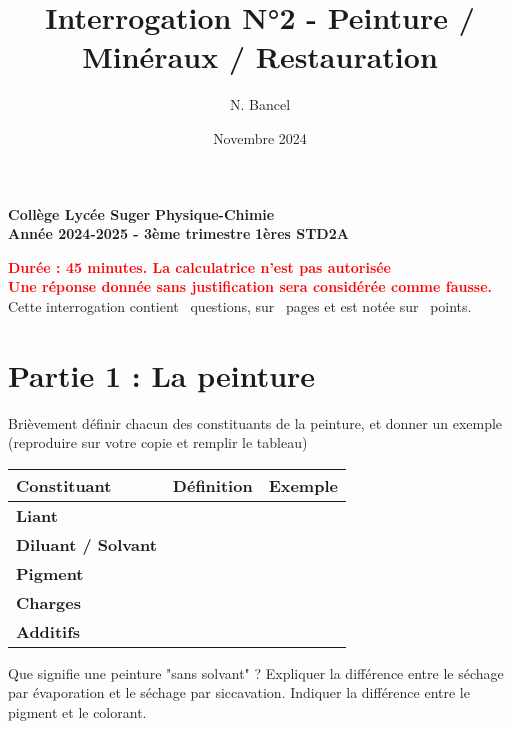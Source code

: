 \documentclass[addpoints]{exam}
\title{Interrogation N°2 - Peinture / Minéraux / Restauration}
\author{N. Bancel}
\date{Novembre 2024}
\begin{document}
\textbf{Collège Lycée Suger}
\hfill
\textbf{Physique-Chimie} \\

\textbf{Année 2024-2025 - 3ème trimestre}
\hfill
\textbf{1ères STD2A} \par

{\let\newpage\relax\maketitle}

\begin{center}
\textbf{\textcolor{red}{Durée : 45 minutes. La calculatrice n'est pas autorisée}} \\
\textbf{\textcolor{red}{Une réponse donnée sans justification sera considérée comme fausse.}} \\
Cette interrogation contient \numquestions\ questions, sur \numpages\ pages et est notée sur \numpoints\ points. 
\end{center}

\section{Partie 1 : La peinture}

\begin{questions}

  \question[4] Brièvement définir chacun des constituants de la peinture, et donner un exemple (reproduire sur votre copie et remplir le tableau)

  \begin{center}
    \begin{tabular}{|>{\bfseries}l|p{7cm}|p{4cm}|}
    \hline
    Constituant & Définition & Exemple \\
    \hline
    Liant &  &  \\
    \hline
    Diluant / Solvant &  &  \\
    \hline
    Pigment & &  \\
    \hline
    Charges &  &  \\
    \hline
    Additifs &  &  \\
    \hline
    \end{tabular}
    \end{center}

  \question[1] Que signifie une peinture "sans solvant" ?
  \question[1] Expliquer la différence entre le séchage par évaporation et le séchage par siccavation.  
  \question[2] Indiquer la différence entre le pigment et le colorant.

  \end{questions}
\end{document}
